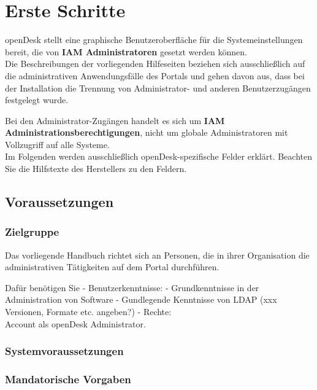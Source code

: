\documentclass[
  letterpaper,
  DIV=11,
  numbers=noendperiod]{scrreprt}
\begin{document}
\chapter{Erste Schritte}\label{erste-schritte-1}

openDesk stellt eine graphische Benutzeroberfläche für die
Systemeinstellungen bereit, die von \textbf{IAM Administratoren} gesetzt
werden können.\\
Die Beschreibungen der vorliegenden Hilfeseiten beziehen sich
ausschließlich auf die administrativen Anwendungsfälle des Portals und
gehen davon aus, dass bei der Installation die Trennung von
Administrator- und anderen Benutzerzugängen festgelegt wurde.

Bei den Administrator-Zugängen handelt es sich um \textbf{IAM
Administrationsberechtigungen}, nicht um globale Administratoren mit
Vollzugriff auf alle Systeme.\\
Im Folgenden werden ausschließlich openDesk-spezifische Felder erklärt.
Beachten Sie die Hilfstexte des Herstellers zu den Feldern.

\section{Voraussetzungen}\label{voraussetzungen}

\subsection{Zielgruppe}\label{zielgruppe}

Das vorliegende Handbuch richtet sich an Personen, die in ihrer
Organisation die administrativen Tätigkeiten auf dem Portal durchführen.

Dafür benötigen Sie - Benutzerkenntnisse: - Grundkenntnisse in der
Administration von Software - Gundlegende Kenntnisse von LDAP (xxx
Versionen, Formate etc. angeben?) - Rechte:\\
Account als openDesk Administrator.

\subsection{Systemvoraussetzungen}\label{systemvoraussetzungen}

\subsection{Mandatorische Vorgaben}\label{mandatorische-vorgaben}
\end{document}
